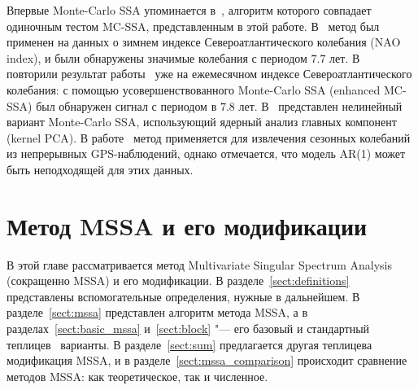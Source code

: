 \documentclass[specialist,
substylefile = spbu_report.rtx,
subf,href,colorlinks=true, 12pt]{disser}
\theoremstyle{definition}
\begin{document}
Впервые Monte-Carlo SSA упоминается в~\cite{Allen}, алгоритм которого совпадает одиночным тестом MC-SSA, представленным в этой работе. В~\cite{NAO} метод был применен на данных о зимнем индексе Североатлантического колебания (NAO index), и были обнаружены значимые колебания с периодом $7.7$ лет. В~\cite{Enchanced_mcssa} повторили результат работы~\cite{NAO} уже на ежемесячном индексе Североатлантического колебания: с помощью усовершенствованного Monte-Carlo SSA (enhanced MC-SSA) был обнаружен сигнал с периодом в $7.8$ лет. В~\cite{non_lin_ssa} представлен нелинейный вариант Monte-Carlo SSA, использующий ядерный анализ главных компонент (kernel PCA). В работе~\cite{gps} метод применяется для извлечения сезонных колебаний из непрерывных GPS-наблюдений, однако отмечается, что модель AR(1) может быть неподходящей для этих данных.




\chapter{Метод MSSA и его модификации}\label{chpt:mssa}
В этой главе рассматривается метод Multivariate Singular Spectrum Analysis~\cite{Golyandina_2015} (сокращенно MSSA) и его модификации. В разделе~\ref{sect:definitions} представлены вспомогательные определения, нужные в дальнейшем. В разделе~\ref{sect:mssa} представлен алгоритм метода MSSA, а в разделах~\ref{sect:basic_mssa} и~\ref{sect:block} "--- его базовый и стандартный теплицев~\cite{Plaut1994SpellsOL} варианты. В разделе~\ref{sect:sum} предлагается другая теплицева модификация MSSA, и в разделе~\ref{sect:mssa_comparison} происходит сравнение методов MSSA: как теоретическое, так и численное.
\end{document}
